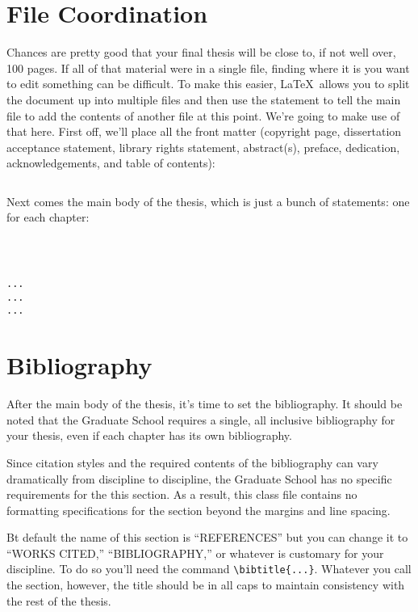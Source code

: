 \section{File Coordination}
Chances are pretty good that your final thesis will be close to, if not well over, 100 pages.  If all of that material were in a single file, finding where it is you want to edit something can be difficult.  To make this easier, \LaTeX\ allows you to split the document up into multiple files and then use the \verb== statement to tell the main file to add the contents of another file at this point.  We're going to make use of that here.  First off, we'll place all the front matter (copyright page, dissertation acceptance statement, library rights statement, abstract(s), preface, dedication, acknowledgements, and table of contents):

\begin{verbatim}

\end{verbatim}

Next comes the main body of the thesis, which is just a bunch of \verb== statements: one for each chapter:

\begin{verbatim}



...
...
...
\end{verbatim}

\section{Bibliography}\label{bib}
After the main body of the thesis, it's time to set the bibliography.  It should be noted that the Graduate School requires a single, all inclusive bibliography for your thesis, even if each chapter has its own bibliography.

Since citation styles and the required contents of the bibliography can vary dramatically from discipline to discipline, the Graduate School has no specific requirements for the this section.  As a result, this class file contains no formatting specifications for the section beyond the margins and line spacing.

Bt default the name of this section is ``REFERENCES'' but you can change it to ``WORKS CITED,'' ``BIBLIOGRAPHY,'' or whatever is customary for your discipline.  To do so you'll need the command \verb=\bibtitle{...}=.  Whatever you call the section, however, the title should be in all caps to maintain consistency with the rest of the thesis.


